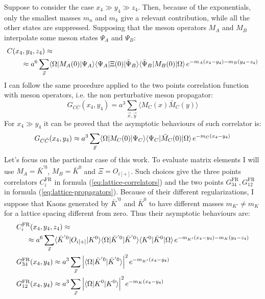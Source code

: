 \documentclass[english, LaM, oneside, noexaminfo]{sapthesis}
\newcommand{\la}{\langle}
\newcommand{\ra}{\rangle}
\begin{document}
Suppose to consider the case $x_4 \gg y_4 \gg z_4$.
Then, because of the exponentials, only the smallest masses $m_n$ and $m_k$ give a relevant contribution, while all the other states are suppressed.
Supposing that the meson operators $M_A$ and $M_B$ interpolate some meson states $\Psi_A$ and $\Psi_B$:
\begin{equation}\label{eq:asymptotic-behav-3pts}
    \begin{split}
        & C(x_4,y_4,z_4)\approx \\
        & \qquad \approx  a^6\sum_{\vec x} \la \Omega | M_A(0) | \Psi_A \ra \la \Psi_A | \Xi (0) | \bar\Psi_B \ra \la \bar\Psi_B | M_B (0) | \Omega \ra \hspace*{.5mm} e^{-m_A(x_4-y_4)-m_B(y_4-z_4)}
    \end{split}
\end{equation}
I can follow the same procedure applied to the two points correlation function with meson operators, i.e. the non perturbative meson propagator:
\begin{equation}\label{eq:2pts-correlator-meson}
    G_{C\bar C}(x_4,y_4) = a^3 \sum_{\vec x, \vec y} \la M_C (x) \bar M_C (y) \ra
\end{equation}
For $x_4 \gg y_4$ it can be proved that the asymptotic behaviours of such correlator is:
\begin{equation}\label{eq:asymptotic-behav-2pts}
    G_{C\bar C}(x_4,y_4) \approx a^3 \sum_{\vec x} \la \Omega | M_C (0) | \Psi_C \ra \la \Psi_C | \bar M_C (0) | \Omega \ra \hspace*{0.5mm} e^{-m_C(x_4-y_4)}
\end{equation}
Let's focus on the particular case of this work.
To evaluate matrix elements I will use $M_A = \bar K^{'0}$, $M_B = \bar K^0$ and $\Xi = O_{i[+]}$.
Such choices give the three points correlators $C_i^\text{FR}$ in formula (\ref{eq:lattice-correlators}) and the two points $G_{34}^\text{FR}, G_{12}^\text{FR}$ in formula (\ref{eq:lattice-propagators}).
Because of their different regularizations, I suppose that Kaons generated by $\bar K^{'0}$ and $\bar K^{0}$ to have different masses $m_{K'} \neq m_K$ for a lattice spacing different from zero.
Thus their asymptotic behaviours are:
\begin{equation*}
    \begin{split}
        & C_i^\text{FR}(x_4,y_4,z_4)\approx \\
        & \hspace*{5mm} \approx a^6\sum_{\vec x} \la \bar K^{'0} | O_{i[+]} | K^0 \ra  \la \Omega | \bar K^{'0} | \bar K^{'0} \ra  \la K^0 | \bar K^0 | \Omega \ra  \hspace*{.5mm} e^{-m_{K'}(x_4-y_4)-m_K(y_4-z_4)}  \\
        & G_{34}^\text{FR}(x_4,y_4) \approx a^3\sum_{\vec x} \Big| \la \Omega | \bar K^{'0} | \bar K^{'0} \ra \Big|^2 \hspace*{.5mm} e^{-m_{K'}(x_4-y_4)} \\
        & G_{12}^\text{FR}(x_4,y_4) \approx a^3\sum_{\vec x} \Big| \la \Omega |  K^0 |  K^0 \ra \Big|^2 \hspace*{.5mm} e^{-m_K(x_4-y_4)} \\
    \end{split}
\end{equation*}
\end{document}
